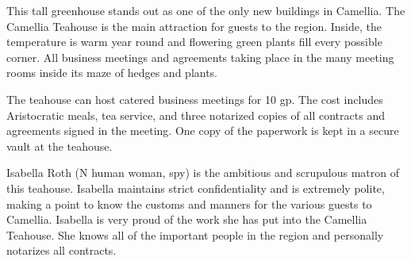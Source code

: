 This tall greenhouse stands out as one of the only new buildings in Camellia.
The Camellia Teahouse is the main attraction for guests to the region.
Inside, the temperature is warm year round and flowering green plants fill every possible corner.
All business meetings and agreements taking place in the many meeting rooms inside its maze of hedges and plants.

The teahouse can host catered business meetings for 10 gp.
The cost includes Aristocratic meals, tea service, and three notarized copies of all contracts and agreements signed in the meeting.
One copy of the paperwork is kept in a secure vault at the teahouse.

Isabella Roth (N human woman, spy) is the ambitious and scrupulous matron of this teahouse.
Isabella maintains strict confidentiality and is extremely polite, making a point to know the customs and manners for the various guests to Camellia.
Isabella is very proud of the work she has put into the Camellia Teahouse.
She knows all of the important people in the region and personally notarizes all contracts.
